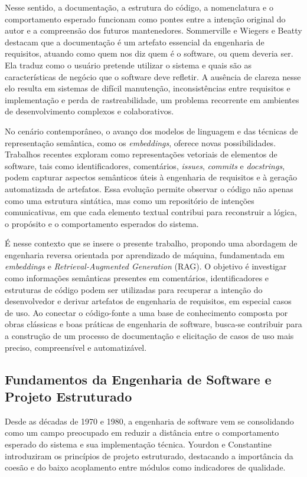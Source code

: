 \documentclass[12pt,a4paper]{article}
\begin{document}
Nesse sentido, a documentação, a estrutura do código, a nomenclatura e o comportamento esperado funcionam como pontes entre a intenção original do autor e a compreensão dos futuros mantenedores. Sommerville e Wiegers e Beatty  destacam que a documentação é um artefato essencial da engenharia de requisitos, atuando como quem nos diz quem é o software, ou quem deveria ser. Ela traduz como o usuário pretende utilizar o sistema e quais são as características de negócio que o software deve refletir. A ausência de clareza nesse elo resulta em sistemas de difícil manutenção, inconsistências entre requisitos e implementação e perda de rastreabilidade, um problema recorrente em ambientes de desenvolvimento complexos e colaborativos.

No cenário contemporâneo, o avanço dos modelos de linguagem e das técnicas de representação semântica, como os \textit{embeddings}, oferece novas possibilidades. Trabalhos recentes exploram como representações vetoriais de elementos de software, tais como identificadores, comentários, \textit{issues}, \textit{commits} e \textit{docstrings}, podem capturar aspectos semânticos úteis à engenharia de requisitos e à geração automatizada de artefatos. Essa evolução permite observar o código não apenas como uma estrutura sintática, mas como um repositório de intenções comunicativas, em que cada elemento textual contribui para reconstruir a lógica, o propósito e o comportamento esperados do sistema.

É nesse contexto que se insere o presente trabalho, propondo uma abordagem de engenharia reversa orientada por aprendizado de máquina, fundamentada em \textit{embeddings} e \textit{Retrieval-Augmented Generation} (RAG). O objetivo é investigar como informações semânticas presentes em comentários, identificadores e estruturas de código podem ser utilizadas para recuperar a intenção do desenvolvedor e derivar artefatos de engenharia de requisitos, em especial casos de uso. Ao conectar o código-fonte a uma base de conhecimento composta por obras clássicas e boas práticas de engenharia de software, busca-se contribuir para a construção de um processo de documentação e elicitação de casos de uso mais preciso, compreensível e automatizável.

\subsection{Fundamentos da Engenharia de Software e Projeto Estruturado}

Desde as décadas de 1970 e 1980, a engenharia de software vem se consolidando como um campo preocupado em reduzir a distância entre o comportamento esperado do sistema e sua implementação técnica. Yourdon e Constantine introduziram os princípios de projeto estruturado, destacando a importância da coesão e do baixo acoplamento entre módulos como indicadores de qualidade.
\end{document}
